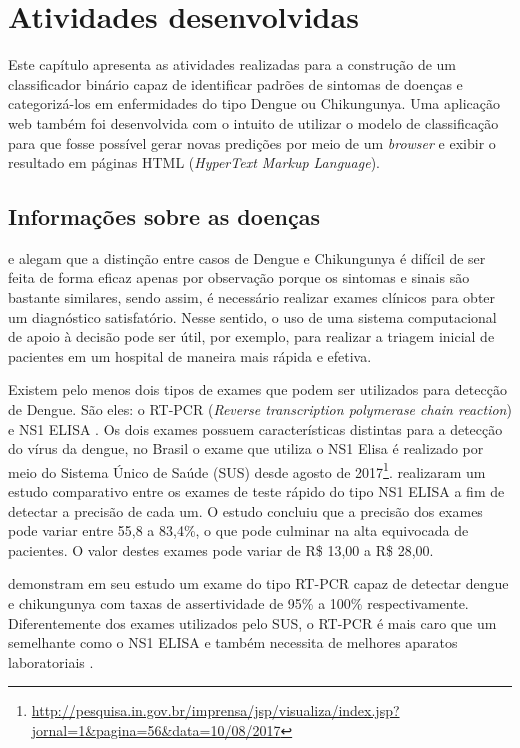 \chapter{Atividades desenvolvidas}

Este capítulo apresenta as atividades realizadas para a construção de um classificador binário capaz de identificar padrões de sintomas de doenças e categorizá-los  em enfermidades do tipo Dengue ou Chikungunya. Uma aplicação web também foi desenvolvida com o intuito de utilizar o modelo de classificação para que fosse possível gerar novas predições por meio de um \textit{browser} e exibir o resultado em páginas HTML (\textit{HyperText Markup Language}).

\section{Informações sobre as doenças}

 e  alegam que  a distinção entre casos de Dengue e Chikungunya é difícil de ser feita de forma eficaz apenas por observação porque os sintomas e sinais são bastante similares, sendo assim, é necessário realizar exames clínicos para obter um diagnóstico satisfatório. Nesse sentido, o uso de uma sistema computacional de apoio à decisão pode ser útil, por exemplo, para realizar a triagem inicial de pacientes em um hospital de maneira mais rápida e efetiva.

Existem pelo menos dois tipos de exames que podem ser utilizados para detecção de Dengue. São eles: o RT-PCR (\textit{Reverse transcription polymerase chain reaction}) e NS1 ELISA \cite{verma2016evaluation}. Os dois exames possuem características distintas para a detecção do vírus da dengue, no Brasil o exame que utiliza o NS1 Elisa é realizado por meio do Sistema Único de Saúde (SUS) desde agosto de 2017\footnote{\url{http://pesquisa.in.gov.br/imprensa/jsp/visualiza/index.jsp?jornal=1&pagina=56&data=10/08/2017}}.  realizaram um estudo comparativo entre os exames de teste rápido do tipo NS1 ELISA a fim de detectar a precisão de cada um. O estudo concluiu que a precisão dos exames pode variar entre 55,8 a 83,4\%, o que pode culminar na alta equivocada de pacientes. O valor destes exames pode variar de R\$ 13,00 a R\$ 28,00.

 demonstram em seu estudo um exame do tipo RT-PCR capaz de detectar dengue e chikungunya com taxas de assertividade de 95\% a 100\% respectivamente. Diferentemente dos exames utilizados pelo SUS, o RT-PCR é mais caro que um semelhante como o NS1 ELISA e também necessita de melhores aparatos laboratoriais \cite{verma2016evaluation}.

